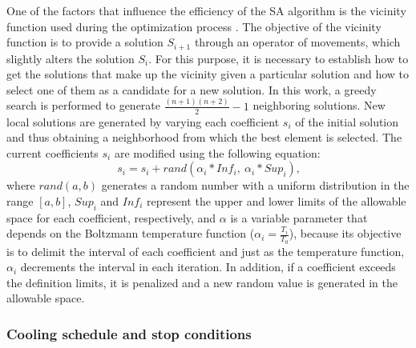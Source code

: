 \documentclass[review]{elsarticle}
\begin{document}
One of the factors that influence the efficiency of the SA algorithm is the vicinity function used during the optimization process \cite{Moscato:1993}. The objective of the vicinity function is to provide a solution $S_{i+1}$ through an operator of movements, which slightly alters the solution $S_i$. For this purpose, it is necessary to establish how to get the solutions that make up the vicinity given a particular solution and how to select one of them as a candidate for a new solution.  In this work, a greedy search is performed to generate $\frac{(n+1)(n+2)}{2}-1$ neighboring solutions. New local solutions are generated by varying each coefficient $s_i$ of the initial solution and thus obtaining a neighborhood from which the best element is selected. The current coefficients $s_i$  are modified using the following equation:
\begin{equation}\label{eq5}
s_i = s_i + rand( \alpha_i*Inf_i,\ \alpha_i *Sup_i) \text{,}
\end{equation}
where $rand(a, b)$ generates a random number with a uniform distribution in the range $[a, b]$, $Sup_i$ and $Inf_i$ represent the upper and lower limits of the allowable space for each coefficient, respectively, and $\alpha$ is a variable parameter that depends on the Boltzmann temperature function ($\alpha_i = \frac{T_i}{T_0}$), because its objective is to delimit the interval of each coefficient and just as the temperature function, $\alpha_i$ decrements the interval in each iteration. In addition, if a coefficient exceeds the definition limits, it is penalized and a new random value is generated in the allowable space.

\subsubsection{Cooling schedule and stop conditions}
\end{document}
